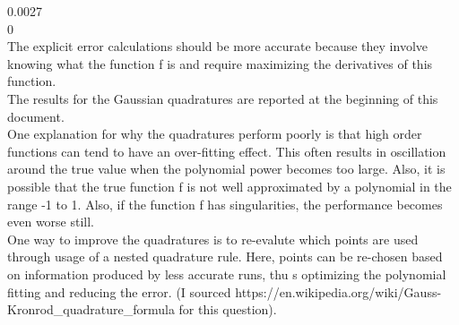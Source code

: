 \documentclass[10pt,a4paper]{article}
\begin{document}
0.0027 \\

0 \\

\noindent
The explicit error calculations should be more accurate because they involve knowing what the function f is and require maximizing the derivatives of this function. \\

\noindent
The results for the Gaussian quadratures are reported at the beginning of this document. \\

\noindent
One explanation for why the quadratures perform poorly is that high order functions can tend to have an over-fitting effect. This often results in oscillation around the true value when the polynomial power becomes too large. Also, it is possible that the true function f is not well approximated by a polynomial in the range -1 to 1. Also, if the function f has singularities, the performance becomes even worse still. \\

\noindent
One way to improve the quadratures is to re-evalute which points are used through usage of a nested quadrature rule. Here, points can be re-chosen based on information produced by less accurate runs, thu s optimizing the polynomial fitting and reducing the error. (I sourced https://en.wikipedia.org/wiki/Gauss-Kronrod\_quadrature\_formula for this question).
\end{document}
